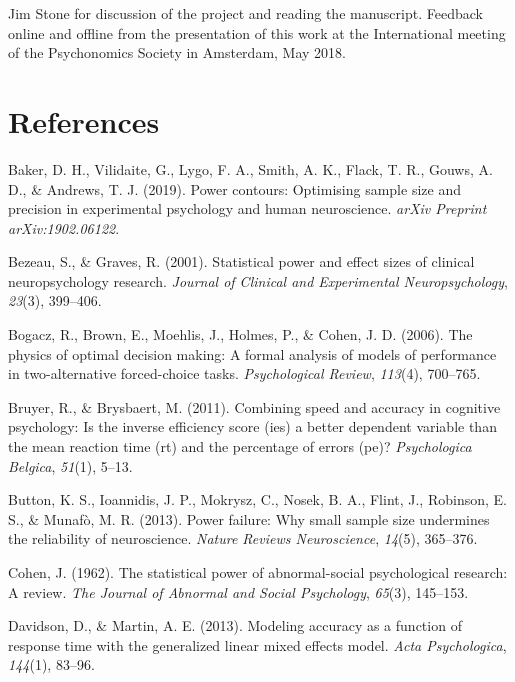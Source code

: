 \documentclass[floatsintext,doc]{apa6}
\theoremstyle{definition}
\theoremstyle{definition}
\theoremstyle{definition}
\theoremstyle{remark}
\begin{document}
Jim Stone for discussion of the project and reading the manuscript.
Feedback online and offline from the presentation of this work at the
International meeting of the Psychonomics Society in Amsterdam, May
2018.

\section*{References}\label{references}

\hypertarget{refs}{}
\hypertarget{ref-baker2019power}{}
Baker, D. H., Vilidaite, G., Lygo, F. A., Smith, A. K., Flack, T. R.,
Gouws, A. D., \& Andrews, T. J. (2019). Power contours: Optimising
sample size and precision in experimental psychology and human
neuroscience. \emph{arXiv Preprint arXiv:1902.06122}.

\hypertarget{ref-bezeau2001statistical}{}
Bezeau, S., \& Graves, R. (2001). Statistical power and effect sizes of
clinical neuropsychology research. \emph{Journal of Clinical and
Experimental Neuropsychology}, \emph{23}(3), 399--406.

\hypertarget{ref-bogacz2006physics}{}
Bogacz, R., Brown, E., Moehlis, J., Holmes, P., \& Cohen, J. D. (2006).
The physics of optimal decision making: A formal analysis of models of
performance in two-alternative forced-choice tasks. \emph{Psychological
Review}, \emph{113}(4), 700--765.

\hypertarget{ref-bruyer2011combining}{}
Bruyer, R., \& Brysbaert, M. (2011). Combining speed and accuracy in
cognitive psychology: Is the inverse efficiency score (ies) a better
dependent variable than the mean reaction time (rt) and the percentage
of errors (pe)? \emph{Psychologica Belgica}, \emph{51}(1), 5--13.

\hypertarget{ref-button2013power}{}
Button, K. S., Ioannidis, J. P., Mokrysz, C., Nosek, B. A., Flint, J.,
Robinson, E. S., \& Munafò, M. R. (2013). Power failure: Why small
sample size undermines the reliability of neuroscience. \emph{Nature
Reviews Neuroscience}, \emph{14}(5), 365--376.

\hypertarget{ref-cohen1962statistical}{}
Cohen, J. (1962). The statistical power of abnormal-social psychological
research: A review. \emph{The Journal of Abnormal and Social
Psychology}, \emph{65}(3), 145--153.

\hypertarget{ref-davidson2013modeling}{}
Davidson, D., \& Martin, A. E. (2013). Modeling accuracy as a function
of response time with the generalized linear mixed effects model.
\emph{Acta Psychologica}, \emph{144}(1), 83--96.
\end{document}
